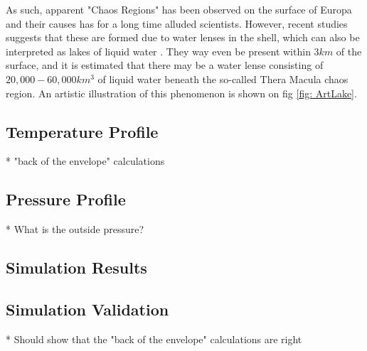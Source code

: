 As such, apparent "Chaos Regions" has been observed on the surface of Europa and their causes has for a long time alluded scientists. However, recent studies suggests that these are formed due to water lenses in the shell, which can also be interpreted as lakes of liquid water \cite{IceLakes}. They way even be present within $3km$ of the surface, and it is estimated that there may be a water lense consisting of $20,000 - 60,000km^3$ of liquid water beneath the so-called Thera Macula chaos region. An artistic illustration of this phenomenon is shown on fig \ref{fig: ArtLake}.

\subsection{Temperature Profile}

* "back of the envelope" calculations

\subsection{Pressure Profile}

* What is the outside pressure?

\subsection{Simulation Results}

\subsection{Simulation Validation}

* Should show that the "back of the envelope" calculations are right



%
%
%
%
%
%    
%
